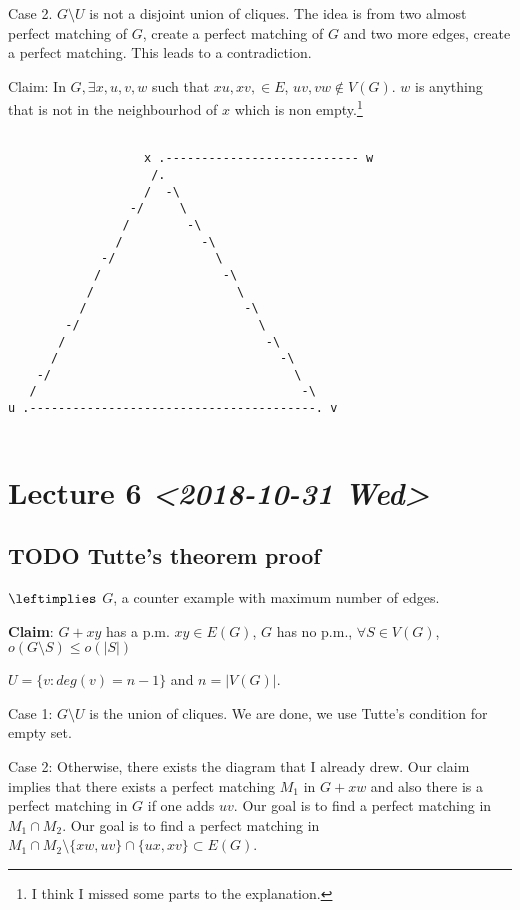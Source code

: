 \documentclass[11pt]{article}
\begin{document}
Case 2. \(G \setminus U\) is not a disjoint union of cliques. The idea is from
two almost perfect matching of \(G\), create a perfect matching of \(G\) and two
more edges, create a perfect matching. This leads to a contradiction. 

Claim: In \(G, \exists x, u, v, w\) such that \(xu, xv, \in E\), \(uv, vw \notin
   V(G)\). \(w\) is anything that is not in the neighbourhod of \(x\) which is non
empty.\footnote{I think I missed some parts to the explanation.}

\begin{verbatim}

                   x .--------------------------- w
                    /.
                   /  -\                           
                 -/     \                          
                /        -\                        
               /           -\                      
             -/              \                     
            /                 -\                   
           /                    \                  
          /                      -\                
        -/                         \               
       /                            -\             
      /                               -\           
    -/                                  \          
   /                                     -\        
u .----------------------------------------. v


\end{verbatim}
\section{Lecture 6 \textit{<2018-10-31 Wed>}}
\label{sec:org263d16c}
\subsection{{\bfseries\sffamily TODO} Tutte's theorem proof}
\label{sec:org70593e0}
\(\leftimplies\) \(G\), a counter example with maximum number of edges.

\textbf{Claim}: \(G+xy\) has a p.m. \(xy\in E(G)\), \(G\) has no p.m., \(\forall S \in
    V(G)\), \(o(G \setminus S) \le o(\vert S \vert)\)

\(U = \{v \colon deg(v) = n-1\}\) and \(n=\vert V(G)\vert\).

Case 1: \(G \setminus U\) is the union of cliques. We are done, we use Tutte's
condition for empty set. 

Case 2: Otherwise, there exists the diagram that I already drew. Our claim
implies that there exists a perfect matching \(M_1\) in \(G + xw\) and also
there is a perfect matching in \(G\) if one adds \(uv\). Our goal is to find a
perfect matching in \(M_1 \cap M_2\). Our goal is to find a perfect matching
in \(M_1 \cap M_2 \setminus \{xw, uv\} \cap \{ux, xv\} \subset E(G)\).
\end{document}
